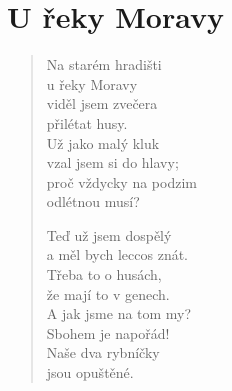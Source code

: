 \section{U řeky Moravy}

\thispagestyle{empty}

\begin{verse}

Na starém hradišti\\
u řeky Moravy\\
viděl jsem zvečera\\
přilétat husy.\\
Už jako malý kluk\\
vzal jsem si do hlavy;\\
proč vždycky na podzim\\
odlétnou musí?

Teď už jsem dospělý\\
a měl bych leccos znát.\\
Třeba to o husách,\\
že mají to v genech.\\
A jak jsme na tom my?\\
Sbohem je napořád!\\
Naše dva rybníčky\\
jsou opuštěné.
\end{verse}

